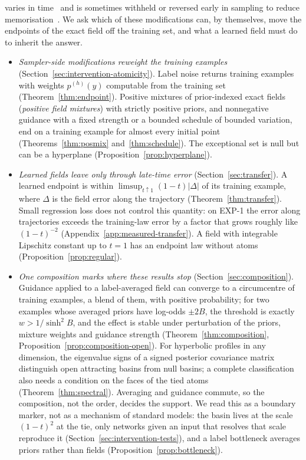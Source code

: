 varies in time~\citep{kynkaanniemi2024interval} and is sometimes withheld or reversed early in
sampling to reduce memorisation~\citep{jain2025attraction}. We ask which of these
modifications can, by themselves, move the endpoints of the exact field off the training set,
and what a learned field must do to inherit the answer.
\begin{itemize}\itemsep1pt
\item \emph{Sampler-side modifications reweight the training examples}
  (Section~\ref{sec:intervention-atomicity}). Label noise returns training examples with weights
  $p^{(h)}(y)$ computable from the training set (Theorem~\ref{thm:endpoint}). Positive mixtures of
  prior-indexed exact fields (\emph{positive field mixtures}) with strictly positive priors, and
  nonnegative guidance with a fixed strength or a bounded schedule of bounded variation, end on a
  training example for almost every initial point (Theorems~\ref{thm:posmix}
  and~\ref{thm:schedule}). The exceptional set is null but can be a hyperplane
  (Proposition~\ref{prop:hyperplane}).
\item \emph{Learned fields leave only through late-time error} (Section~\ref{sec:transfer}). A
  learned endpoint is within $\limsup_{t\uparrow1}(1-t)|\Delta|$ of its training example, where
  $\Delta$ is the field error along the trajectory (Theorem~\ref{thm:transfer}). Small regression
  loss does not control this quantity: on EXP-1 the error along trajectories
  exceeds the training-law error by a factor that grows roughly like $(1-t)^{-2}$
  (Appendix~\ref{app:measured-transfer}). A field with integrable Lipschitz constant up to $t=1$
  has an endpoint law without atoms (Proposition~\ref{prop:regular}).
\item \emph{One composition marks where these results stop} (Section~\ref{sec:composition}).
  Guidance applied to a label-averaged field can converge to a circumcentre of training examples,
  a blend of them, with positive probability; for two examples whose averaged priors have log-odds
  $\pm2B$, the threshold is exactly $w>1/\sinh^2B$, and the effect is stable under perturbation of
  the priors, mixture weights and guidance strength (Theorem~\ref{thm:composition},
  Proposition~\ref{prop:composition-open}). For hyperbolic profiles in any dimension, the
  eigenvalue signs of a signed posterior covariance matrix distinguish open attracting basins
  from null basins; a complete classification also needs a condition on the faces of the tied
  atoms (Theorem~\ref{thm:spectral}). Averaging and guidance commute, so the composition, not the
  order, decides the support. We read this as a boundary marker, not as a mechanism of
  standard models: the basin lives at the scale $(1-t)^2$ at the tie, only networks given an
  input that resolves that scale reproduce it (Section~\ref{sec:intervention-tests}), and a label
  bottleneck averages priors rather than fields (Proposition~\ref{prop:bottleneck}).
\end{itemize}
